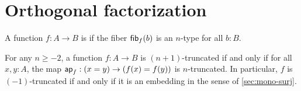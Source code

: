 \documentclass[hott-all.tex]{subfiles}
\begin{document}
\section{Orthogonal factorization}
% 
% 
\begin{defn}
  A function $f:A\to B$ is 
if the fiber ${\mathsf{fib}}_{f}(b)$ is an $n$-type for all $b:B$.
\end{defn}
% 
% 
\begin{lem}
  For any $n\ge -2$, a function $f:A\to B$ is $(n+1)$-truncated if and only if for all $x,y:A$, the map $\mathsf{ap}_{f}:(x=y) \to (f(x)=f(y))$ is $n$-truncated.
  In particular, $f$ is $(-1)$-truncated if and only if it is an embedding in the sense of \cref{sec:mono-surj}.
\end{lem}
% 
\end{document}
